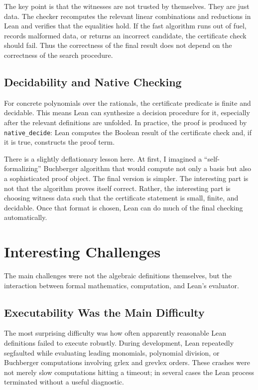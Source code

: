 \documentclass[acmsmall,nonacm,screen]{acmart}
\begin{document}
The key point is that the witnesses are not trusted by themselves.
They are just data.
The checker recomputes the relevant linear combinations and reductions in Lean and verifies that
the equalities hold.
If the fast algorithm runs out of fuel, records malformed data, or returns an incorrect candidate,
the certificate check should fail.
Thus the correctness of the final result does not depend on the correctness of the search
procedure.

\subsection{Decidability and Native Checking}

For concrete polynomials over the rationals, the certificate predicate is finite and decidable.
This means Lean can synthesize a decision procedure for it, especially after the relevant
definitions are unfolded.
In practice, the proof is produced by \texttt{native\_decide}: Lean computes the Boolean result of
the certificate check and, if it is true, constructs the proof term.

There is a slightly deflationary lesson here.
At first, I imagined a ``self-formalizing'' Buchberger algorithm that would compute not only a
basis but also a sophisticated proof object.
The final version is simpler.
The interesting part is not that the algorithm proves itself correct.
Rather, the interesting part is choosing witness data such that the certificate statement is small,
finite, and decidable.
Once that format is chosen, Lean can do much of the final checking automatically.

\section{Interesting Challenges}

The main challenges were not the algebraic definitions themselves, but the interaction between
formal mathematics, computation, and Lean's evaluator.

\subsection{Executability Was the Main Difficulty}

The most surprising difficulty was how often apparently reasonable Lean definitions failed to
execute robustly.
During development, Lean repeatedly segfaulted while evaluating leading monomials, polynomial
division, or Buchberger computations involving grlex and grevlex orders.
These crashes were not merely slow computations hitting a timeout; in several cases the Lean
process terminated without a useful diagnostic.
\end{document}
